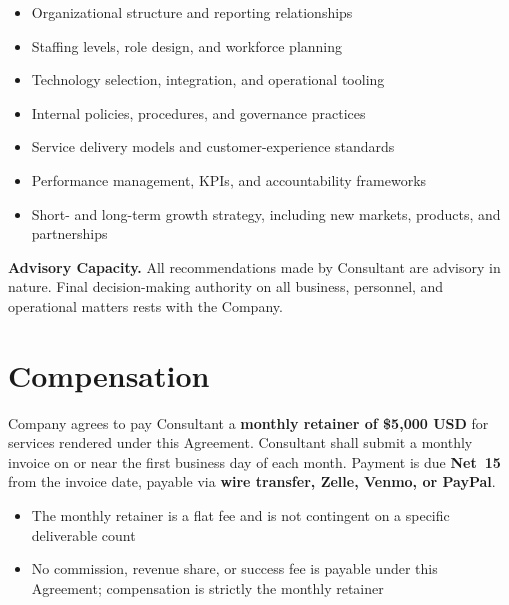 \documentclass{toospoint}
\begin{document}
\begin{itemize}[leftmargin=1.5em, itemsep=3pt, topsep=4pt]
  \item Organizational structure and reporting relationships
  \item Staffing levels, role design, and workforce planning
  \item Technology selection, integration, and operational tooling
  \item Internal policies, procedures, and governance practices
  \item Service delivery models and customer-experience standards
  \item Performance management, KPIs, and accountability frameworks
  \item Short- and long-term growth strategy, including new markets, products, and partnerships
\end{itemize}

\begin{clausebox}
\sffamily\footnotesize\color{TPGray}
\textbf{Advisory Capacity.} All recommendations made by Consultant are advisory
in nature. Final decision-making authority on all business, personnel, and
operational matters rests with the Company.
\end{clausebox}

\section{Compensation}

Company agrees to pay Consultant a \textbf{monthly retainer of \$5{,}000 USD}
for services rendered under this Agreement. Consultant shall submit a monthly
invoice on or near the first business day of each month. Payment is due
\textbf{Net~15} from the invoice date, payable via \textbf{wire transfer,
Zelle, Venmo, or PayPal}.

\begin{itemize}[leftmargin=1.5em, itemsep=4pt, topsep=4pt]
  \item The monthly retainer is a flat fee and is not contingent on a specific deliverable count
  \item No commission, revenue share, or success fee is payable under this Agreement; compensation is strictly the monthly retainer
\end{itemize}

\end{document}
